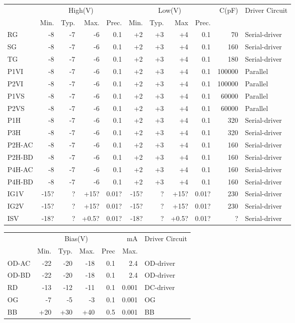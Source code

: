 \documentclass[a4paper,12pt]{article}
\begin{document}
\begin{tabular}{|l|rrrr|rrrr|r|l|}
\hline
&\multicolumn{4}{c|}{High(V)}&\multicolumn{4}{c|}{Low(V)}& C(pF)& Driver Circuit \\ 
&Min.&Typ.&Max.&Prec.&Min.&Typ.&Max&Prec.&& \\
\hline
RG & -8 & -7 & -6 & 0.1 & +2 & +3 & +4 & 0.1 & 70 & Serial-driver \\
SG & -8 & -7 & -6 & 0.1 & +2 & +3 & +4 & 0.1 & 160 & Serial-driver \\
TG & -8 & -7 & -6 & 0.1 & +2 & +3 & +4 & 0.1 & 180 & Serial-driver \\
P1VI & -8 & -7 & -6 & 0.1 & +2 & +3 & +4 & 0.1 & 100000 & Parallel \\
P2VI & -8 & -7 & -6 & 0.1 & +2 & +3 & +4 & 0.1 & 100000 & Parallel \\
P1VS & -8 & -7 & -6 & 0.1 & +2 & +3 & +4 & 0.1 & 60000 & Parallel \\
P2VS & -8 & -7 & -6 & 0.1 & +2 & +3 & +4 & 0.1 & 60000 & Parallel \\
P1H & -8 & -7 & -6 & 0.1 & +2 & +3 & +4 & 0.1 & 320 & Serial-driver \\
P3H & -8 & -7 & -6 & 0.1 & +2 & +3 & +4 & 0.1 & 320 & Serial-driver \\
P2H-AC & -8 & -7 & -6 & 0.1 & +2 & +3 & +4 & 0.1 & 160 & Serial-driver \\
P2H-BD & -8 & -7 & -6 & 0.1 & +2 & +3 & +4 & 0.1 & 160 & Serial-driver \\
P4H-AC & -8 & -7 & -6 & 0.1 & +2 & +3 & +4 & 0.1 & 160 & Serial-driver \\
P4H-BD & -8 & -7 & -6 & 0.1 & +2 & +3 & +4 & 0.1 & 160 & Serial-driver \\
IG1V & -15? & ? & +15? & 0.01? & -15? & ? & +15? & 0.01? & 230 & Serial-driver \\
IG2V & -15? & ? & +15? & 0.01? & -15? & ? & +15? & 0.01? & 230 & Serial-driver \\
ISV & -18? & ? & +0.5? & 0.01? & -18? & ? & +0.5? & 0.01? & ? & Serial-driver \\
\hline
\end{tabular}

\begin{tabular}{|l|rrrr|r|l|}
\hline
&\multicolumn{4}{c|}{Bias(V)} &mA&Driver Circuit \\
&Min.& Typ.& Max.&Prec& Max.&\\
\hline
OD-AC &-22 &-20& -18& 0.1&2.4&OD-driver \\
OD-BD &-22& -20& -18&0.1& 2.4&OD-driver \\
RD &-13& -12 &-11& 0.1&0.001&DC-driver \\
OG& -7& -5& -3&  0.1&0.001&OG \\
BB &+20 &+30 &+40 &0.5&0.001&BB \\
\hline
\end{tabular}
\end{document}

